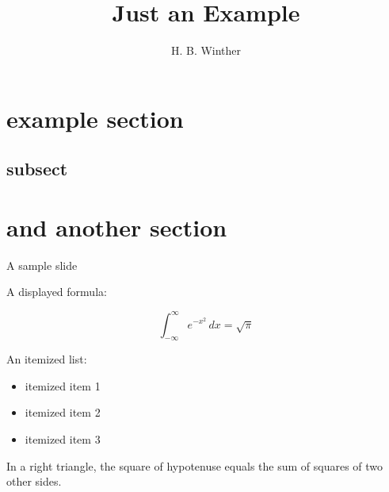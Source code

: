 \documentclass{beamer}
\author{H. B. Winther}
\title{Just an Example}
\begin{document}
\maketitle

\section{example section}
\subsection{subsect}
\section{and another section}

\begin{frame}{A sample slide}

A displayed formula:

\[
  \int_{-\infty}^\infty e^{-x^2} \, dx = \sqrt{\pi}
\]

An itemized list:

\begin{itemize}
  \item itemized item 1
  \item itemized item 2
  \item itemized item 3
\end{itemize}

\begin{theorem}
  In a right triangle, the square of hypotenuse equals
  the sum of squares of two other sides.
\end{theorem}

\end{frame}
\end{document}
